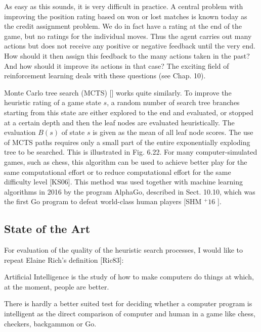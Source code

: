 \documentclass[10pt]{book}
\begin{document}
As easy as this sounds, it is very difficult in practice. A central problem with improving the position rating based on won or lost matches is known today as the credit assignment problem. We do in fact have a rating at the end of the game, but no ratings for the individual moves. Thus the agent carries out many actions but does not receive any positive or negative feedback until the very end. How should it then assign this feedback to the many actions taken in the past? And how should it improve its actions in that case? The exciting field of reinforcement learning deals with these questions (see Chap. 10).

Monte Carlo tree search (MCTS) [\cite{kocsis2006uct}] works quite similarly. To improve the heuristic rating of a game state $s$, a random number of search tree branches starting from this state are either explored to the end and evaluated, or stopped at a certain depth and then the leaf nodes are evaluated heuristically. The evaluation $B(s)$ of state $s$ is given as the mean of all leaf node scores. The use of MCTS paths requires only a small part of the entire exponentially exploding tree to be searched. This is illustrated in Fig. 6.22. For many computer-simulated games, such as chess, this algorithm can be used to achieve better play for the same computational effort or to reduce computational effort for the same difficulty level [KS06]. This method was used together with machine learning algorithms in 2016 by the program AlphaGo, described in Sect. 10.10, which was the first Go program to defeat world-class human players [SHM ${ }^{+} 16$ ].

\subsection{State of the Art}
For evaluation of the quality of the heuristic search processes, I would like to repeat Elaine Rich's definition [Ric83]:

Artificial Intelligence is the study of how to make computers do things at which, at the moment, people are better.

There is hardly a better suited test for deciding whether a computer program is intelligent as the direct comparison of computer and human in a game like chess, checkers, backgammon or Go.
\end{document}
